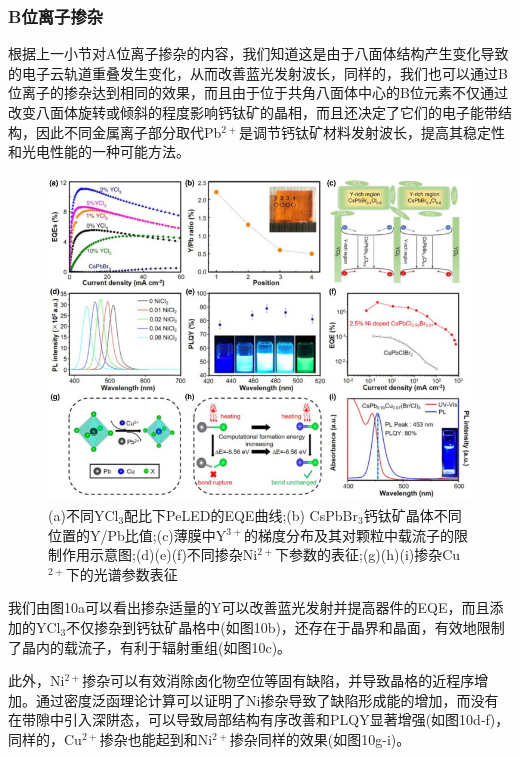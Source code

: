 \documentclass{phyasgn}\usepackage{nag}
\begin{document}
\subsubsection{B位离子掺杂}
\par 根据上一小节对A位离子掺杂的内容，我们知道这是由于八面体结构产生变化导致的电子云轨道重叠发生变化，从而改善蓝光发射波长，同样的，我们也可以通过B位离子的掺杂达到相同的效果，而且由于位于共角八面体中心的B位元素不仅通过改变八面体旋转或倾斜的程度影响钙钛矿的晶相，而且还决定了它们的电子能带结构，因此不同金属离子部分取代Pb$^{2+}$是调节钙钛矿材料发射波长，提高其稳定性和光电性能的一种可能方法。
	\begin{figure}[H]
		\centering
		\hspace{2em}\includegraphics[width=.8\linewidth]{pic/9.jpg}
		\caption{(a)不同YCl$_{3}$配比下PeLED的EQE曲线;(b) CsPbBr$_{3}$钙钛矿晶体不同位置的Y/Pb比值;(c)薄膜中Y$^{3+}$的梯度分布及其对颗粒中载流子的限制作用示意图;(d)(e)(f)不同掺杂Ni$^{2+}$下参数的表征;(g)(h)(i)掺杂Cu$^{2+}$下的光谱参数表征
        \cite{zhang2021blue}
		}
	\end{figure}
\par 我们由图10a可以看出掺杂适量的Y可以改善蓝光发射并提高器件的EQE，而且添加的YCl$_3$不仅掺杂到钙钛矿晶格中(如图10b)，还存在于晶界和晶面，有效地限制了晶内的载流子，有利于辐射重组(如图10c)。
\par 此外，Ni$^{2+}$掺杂可以有效消除卤化物空位等固有缺陷，并导致晶格的近程序增加。通过密度泛函理论计算可以证明了Ni掺杂导致了缺陷形成能的增加，而没有在带隙中引入深阱态，可以导致局部结构有序改善和PLQY显著增强(如图10d-f)，同样的，Cu$^{2+}$掺杂也能起到和Ni$^{2+}$掺杂同样的效果(如图10g-i)。
\end{document}
